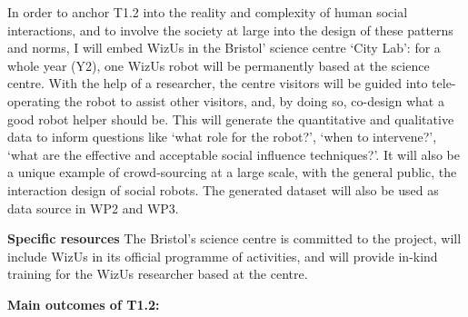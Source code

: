 \documentclass[11pt,a4paper]{report}
\newcommand{\project}{WizUs\xspace}
\begin{document}
In order to anchor T1.2 into the reality and complexity of human social
interactions, and to involve the society at large into the design of these
patterns and norms, I will embed \project in the Bristol' science centre `City
Lab': for a whole year (Y2), one \project robot will be permanently based at the
science centre. With the help of a researcher, the centre visitors will be guided into
tele-operating the robot to assist other visitors, and, by doing so, co-design
what a good robot helper should be. This will generate the quantitative and
qualitative data to inform questions like `what role for the robot?', `when to
intervene?', `what are the effective and acceptable social influence
techniques?'. It will also be a unique example of crowd-sourcing at a large
scale, with the general public, the interaction design of social robots.  The
generated dataset will also be used as data source in WP2 and WP3.

\textbf{Specific resources} The Bristol's science centre is committed to the
project, will include \project in its official programme of activities, and will
provide in-kind training for the \project researcher based at the centre.

\begin{framed}
    {\bf Main outcomes of T1.2:}
\end{framed}

% 
% 
% 
% 
% 
% 
% 
% 
% 
\end{document}
